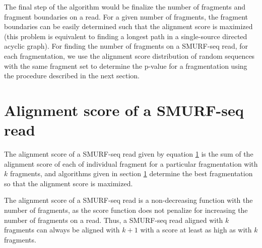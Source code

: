 The final step of the algorithm would be finalize the number of fragments
and fragment boundaries on a read. For a given number of fragments, the
fragment boundaries can be easily determined such that the alignment
score is maximized (this problem is equivalent to finding a longest path
in a single-source directed acyclic graph).
%
For finding the number of fragments on a SMURF-seq read, for each
fragmentation, we use the
alignment score distribution of random sequences with the same
fragment set to determine the p-value for a fragmentation using the
procedure described in the next section.



\section{Alignment score of a SMURF-seq read}
The alignment score of a SMURF-seq read given by equation \ref{}
is the sum of the alignment score of each of individual fragment
for a particular fragmentation with $k$ fragments,
and algorithms given in section \ref{} determine the best fragmentation
so that the alignment score is maximized.

The alignment score of a SMURF-seq read is a non-decreasing function with
the number of fragments, as the score function does not penalize for
increasing the number of fragments on a read. Thus, a SMURF-seq read
aligned with $k$ fragments can always be aligned with $k+1$ with a
score at least as high as with $k$ fragments.

